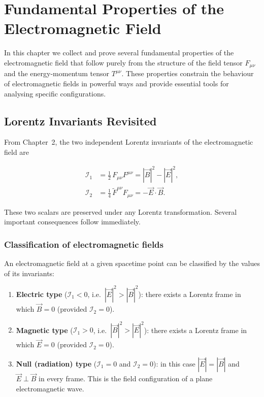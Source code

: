 \chapter{Fundamental Properties of the Electromagnetic Field}

In this chapter we collect and prove several fundamental properties of the electromagnetic field that follow purely from the structure of the field tensor $F_{\mu\nu}$ and the energy-momentum tensor $T^{\mu\nu}$. These properties constrain the behaviour of electromagnetic fields in powerful ways and provide essential tools for analysing specific configurations.

\section{Lorentz Invariants Revisited}

From Chapter~2, the two independent Lorentz invariants of the electromagnetic field are

\begin{align}
\mathcal{I}_1 &= \frac{1}{2}\,F_{\mu\nu}F^{\mu\nu} = |\vec{B}|^2 - |\vec{E}|^2, \\
\mathcal{I}_2 &= \frac{1}{4}\,\widetilde{F}^{\mu\nu}F_{\mu\nu} = -\vec{E}\cdot\vec{B}.
\end{align}

These two scalars are preserved under any Lorentz transformation. Several important consequences follow immediately.

\subsection{Classification of electromagnetic fields}

An electromagnetic field at a given spacetime point can be classified by the values of its invariants:

\begin{enumerate}
\item \textbf{Electric type} ($\mathcal{I}_1 < 0$, i.e.\ $|\vec{E}|^2 > |\vec{B}|^2$): there exists a Lorentz frame in which $\vec{B} = 0$ (provided $\mathcal{I}_2 = 0$).
\item \textbf{Magnetic type} ($\mathcal{I}_1 > 0$, i.e.\ $|\vec{B}|^2 > |\vec{E}|^2$): there exists a Lorentz frame in which $\vec{E} = 0$ (provided $\mathcal{I}_2 = 0$).
\item \textbf{Null (radiation) type} ($\mathcal{I}_1 = 0$ and $\mathcal{I}_2 = 0$): in this case $|\vec{E}| = |\vec{B}|$ and $\vec{E}\perp\vec{B}$ in every frame. This is the field configuration of a plane electromagnetic wave.
\end{enumerate}

